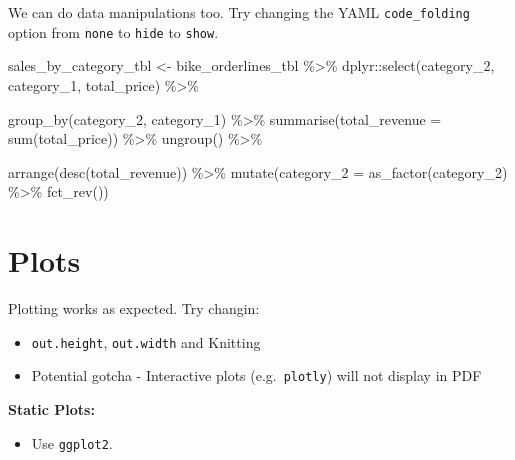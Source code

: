 \documentclass[
]{article}
\newenvironment{Shaded}{\begin{snugshade}}{\end{snugshade}}
\newcommand{\AttributeTok}[1]{\textcolor[rgb]{0.77,0.63,0.00}{#1}}
\newcommand{\FunctionTok}[1]{\textcolor[rgb]{0.00,0.00,0.00}{#1}}
\newcommand{\NormalTok}[1]{#1}
\newcommand{\OtherTok}[1]{\textcolor[rgb]{0.56,0.35,0.01}{#1}}
\newcommand{\SpecialCharTok}[1]{\textcolor[rgb]{0.00,0.00,0.00}{#1}}
\providecommand{\tightlist}{%
  \setlength{\itemsep}{0pt}\setlength{\parskip}{0pt}}
\begin{document}
We can do data manipulations too. Try changing the YAML
\texttt{code\_folding} option from \texttt{none} to \texttt{hide} to
\texttt{show}.

\begin{Shaded}
\begin{Highlighting}[]
\NormalTok{sales\_by\_category\_tbl }\OtherTok{\textless{}{-}}\NormalTok{ bike\_orderlines\_tbl }\SpecialCharTok{\%\textgreater{}\%}
\NormalTok{  dplyr}\SpecialCharTok{::}\FunctionTok{select}\NormalTok{(category\_2, category\_1, total\_price) }\SpecialCharTok{\%\textgreater{}\%}
  
  \FunctionTok{group\_by}\NormalTok{(category\_2, category\_1) }\SpecialCharTok{\%\textgreater{}\%}
  \FunctionTok{summarise}\NormalTok{(}\AttributeTok{total\_revenue =} \FunctionTok{sum}\NormalTok{(total\_price)) }\SpecialCharTok{\%\textgreater{}\%}
  \FunctionTok{ungroup}\NormalTok{() }\SpecialCharTok{\%\textgreater{}\%}
  
  \FunctionTok{arrange}\NormalTok{(}\FunctionTok{desc}\NormalTok{(total\_revenue)) }\SpecialCharTok{\%\textgreater{}\%}
  \FunctionTok{mutate}\NormalTok{(}\AttributeTok{category\_2 =} \FunctionTok{as\_factor}\NormalTok{(category\_2) }\SpecialCharTok{\%\textgreater{}\%} \FunctionTok{fct\_rev}\NormalTok{())}
\end{Highlighting}
\end{Shaded}

\hypertarget{plots}{%
\section{Plots}\label{plots}}

Plotting works as expected. Try changin:

\begin{itemize}
\item
  \texttt{out.height}, \texttt{out.width} and Knitting
\item
  Potential gotcha - Interactive plots (e.g.~\texttt{plotly}) will not
  display in PDF
\end{itemize}

\textbf{Static Plots:}

\begin{itemize}
\tightlist
\item
  Use \texttt{ggplot2}.
\end{itemize}
\end{document}
